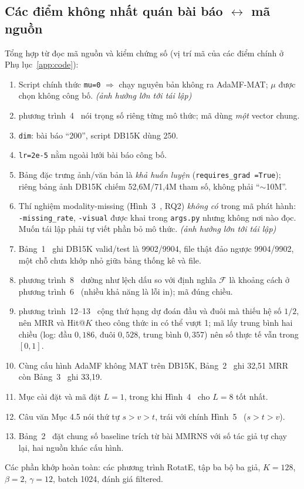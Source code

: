 \documentclass[conference]{IEEEtran}
\begin{document}
\subsection{Các điểm không nhất quán bài báo $\leftrightarrow$ mã nguồn}
Tổng hợp từ đọc mã nguồn và kiểm chứng số (vị trí mã của các điểm chính ở Phụ lục~\ref{app:code}):
\begin{enumerate}
  \item Script chính thức \texttt{mu=0} $\Rightarrow$ chạy nguyên bản không ra
  AdaMF-MAT; $\mu$ được chọn không công bố. \emph{(ảnh hưởng lớn tới tái lập)}
  \item phương trình~4~\cite{adamfmat} nói trọng số riêng từng mô thức; mã dùng \emph{một} vector chung.
  \item \texttt{dim}: bài báo ``200'', script DB15K dùng 250.
  \item \texttt{lr=2e-5} nằm ngoài lưới bài báo công bố.
  \item Bảng đặc trưng ảnh/văn bản là \emph{khả huấn luyện} (\texttt{requires\_grad
  =True}); riêng bảng ảnh DB15K chiếm 52,6M/71,4M tham số, không phải ``$\sim$10M''.
  \item Thí nghiệm modality-missing (Hình~3~\cite{adamfmat}, RQ2) \emph{không có} trong mã phát
  hành: \texttt{-missing\_rate}, \texttt{-visual} được khai trong \texttt{args.py}
  nhưng không nơi nào đọc. Muốn tái lập phải tự viết phần bỏ mô thức. \emph{(ảnh hưởng lớn tới tái lập)}
  \item Bảng~1~\cite{adamfmat} ghi DB15K valid/test là 9902/9904, file thật đảo ngược 9904/9902, một chỗ chưa khớp nhỏ giữa bảng thống kê và file.
  \item phương trình~8~\cite{adamfmat} dường như lệch dấu so với định nghĩa $\mathcal{F}$ là khoảng cách ở phương trình~6~\cite{adamfmat} (nhiều khả năng là lỗi in); mã đúng chiều.
  \item phương trình~12--13~\cite{adamfmat} cộng thứ hạng dự đoán đầu và đuôi mà thiếu hệ số $1/2$, nên MRR và Hit@$K$ theo công thức in có thể vượt 1; mã lấy trung bình hai chiều (log: đầu $0{,}186$, đuôi $0{,}528$, trung bình $0{,}357$) nên số thực tế vẫn trong $[0,1]$.
  \item Cùng cấu hình AdaMF không MAT trên DB15K, Bảng~2~\cite{adamfmat} ghi 32,51 MRR còn Bảng~3~\cite{adamfmat} ghi 33,19.
  \item Mục cài đặt và mã đặt $L=1$, trong khi Hình~4~\cite{adamfmat} cho $L=8$ tốt nhất.
  \item Câu văn Mục 4.5 nói thứ tự $s>v>t$, trái với chính Hình~5~\cite{adamfmat} ($s>t>v$).
  \item Bảng~2~\cite{adamfmat} đặt chung số baseline trích từ bài MMRNS với số tác giả tự chạy lại, hai nguồn khác cấu hình.
\end{enumerate}
Các phần khớp hoàn toàn: các phương trình RotatE, tập ba bộ ba giả, $K=128$,
$\beta=2$, $\gamma=12$, batch 1024, đánh giá filtered.
\end{document}
